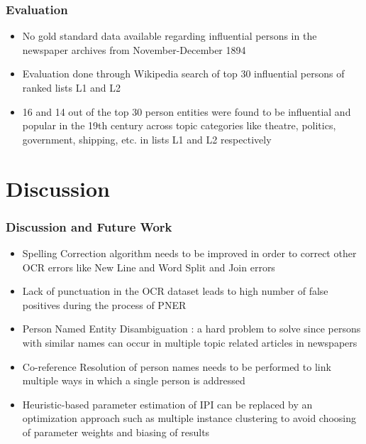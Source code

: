 \documentclass{beamer}
\begin{document}
\begin{frame}
\frametitle{Evaluation}
\begin{itemize}
\item
No gold standard data available regarding influential persons  in the newspaper archives from November-December 1894
\item
Evaluation done through Wikipedia search of top 30 influential persons of ranked lists L1 and L2
\item 16 and 14 out of the top 30 person entities were found to be influential and popular in the 19th century across topic categories like theatre, politics, government, shipping, etc. in lists L1 and L2 respectively

\end{itemize}
\end{frame}


\section{Discussion}
\begin{frame}
\frametitle{Discussion and Future Work}
\begin{itemize}
\item
Spelling Correction algorithm needs to be improved in order to correct other OCR errors like New Line and Word Split and Join errors
\item
Lack of punctuation in the OCR dataset leads to high number of false positives during the process of PNER
\item
Person Named Entity Disambiguation : a hard problem to solve since persons with similar names can occur in multiple topic related articles in newspapers
\item
Co-reference Resolution of person names needs to be performed to link multiple ways in which a single person is addressed
\item
Heuristic-based parameter estimation of IPI can be replaced by an optimization approach such as multiple instance clustering to avoid choosing of parameter weights  and biasing of results 
\end{itemize}
\end{frame}
\end{document}
